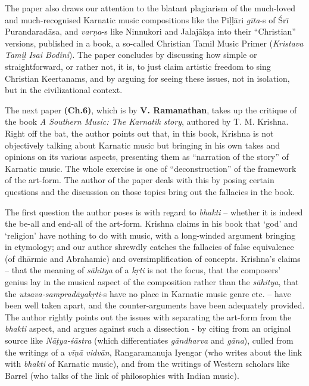 The paper also draws our attention to the blatant plagiarism of the much-loved and much-recognised Karnatic music compositions like the Piḷḷāri \textit{gīta}-s of Śrī Purandaradāsa, and \textit{varṇa}-s like Ninnukori and Jalajākṣa into their “Christian” versions, published in a book, a so-called Christian Tamil Music Primer (\textit{Kristava Tamiḻ Isai Bodini}). The paper concludes by discussing how simple or straightforward, or rather not, it is, to just claim artistic freedom to sing Christian Keertanams, and by arguing for seeing these issues, not in isolation, but in the civilizational context.

The next paper \textbf{(Ch.6)}, which is by \textbf{V. Ramanathan}, takes up the critique of the book \textit{A Southern Music: The Karnatik story}, authored by T. M. Krishna. Right off the bat, the author points out that, in this book, Krishna is not objectively talking about Karnatic music but bringing in his own takes and opinions on its various aspects, presenting them as “narration of the story” of Karnatic music. The whole exercise is one of “deconstruction” of the framework of the art-form. The author of the paper deals with this by posing certain questions and the discussion on those topics bring out the fallacies in the book.

The first question the author poses is with regard to \textit{bhakti} – whether it is indeed the be-all and end-all of the art-form. Krishna claims in his book that ‘god’ and ‘religion’ have nothing to do with music, with a long-winded argument bringing in etymology; and our author shrewdly catches the fallacies of false equivalence (of dhārmic and Abrahamic) and oversimplification of concepts. Krishna’s claims – that the meaning of \textit{sāhitya} of a \textit{kṛti} is not the focus, that the composers’ genius lay in the musical aspect of the composition rather than the \textit{sāhitya}, that the \textit{utsava-sampradāyakṛti}-s have no place in Karnatic music genre etc. – have been well taken apart, and the counter-arguments have been adequately provided. The author rightly points out the issues with separating the art-form from the \textit{bhakti} aspect, and argues against such a dissection - by citing from an original source like \textit{Nāṭya-śāstra} (which differentiates \textit{gāndharva} and \textit{gāna}), culled from the writings of a \textit{vīṇā vidvān}, Rangaramanuja Iyengar (who writes about the link with \textit{bhakti} of Karnatic music), and from the writings of Western scholars like Barrel (who talks of the link of philosophies with Indian music).

